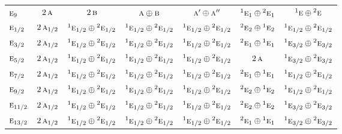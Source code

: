 \documentclass[10pt,a4paper]{article}
\numberwithin{equation}{section}
\newcommand{\irr}[1]{\text{\normalfont\scshape #1}}
\newcommand{\conjpair}[1]{{}^{#1}}
\begin{document}
{\begin{longtable}{@{}lcccccc@{}}
$\irr{e}_{9}$ & $2\,\irr{a}$ & $2\,\irr{b}$ & $\irr{a}\oplus \irr{b}$ & $\irr{a}'\oplus \irr{a}''$ & $\conjpair{1}\irr{e}_{1}\oplus \conjpair{2}\irr{e}_{1}$ & $\conjpair{1}\irr{e}\oplus \conjpair{2}\irr{e}$\\
$\irr{e}_{1/2}$ & $2\,\irr{a}_{1/2}$ & $\conjpair{1}\irr{e}_{1/2}\oplus \conjpair{2}\irr{e}_{1/2}$ & $\conjpair{1}\irr{e}_{1/2}\oplus \conjpair{2}\irr{e}_{1/2}$ & $\conjpair{1}\irr{e}_{1/2}\oplus \conjpair{2}\irr{e}_{1/2}$ & $\conjpair{2}\irr{e}_{2}\oplus \conjpair{1}\irr{e}_{2}$ & $\conjpair{1}\irr{e}_{1/2}\oplus \conjpair{2}\irr{e}_{1/2}$\\
$\irr{e}_{3/2}$ & $2\,\irr{a}_{1/2}$ & $\conjpair{1}\irr{e}_{1/2}\oplus \conjpair{2}\irr{e}_{1/2}$ & $\conjpair{1}\irr{e}_{1/2}\oplus \conjpair{2}\irr{e}_{1/2}$ & $\conjpair{1}\irr{e}_{1/2}\oplus \conjpair{2}\irr{e}_{1/2}$ & $\conjpair{2}\irr{e}_{1}\oplus \conjpair{1}\irr{e}_{1}$ & $\conjpair{1}\irr{e}_{3/2}\oplus \conjpair{2}\irr{e}_{3/2}$\\
$\irr{e}_{5/2}$ & $2\,\irr{a}_{1/2}$ & $\conjpair{1}\irr{e}_{1/2}\oplus \conjpair{2}\irr{e}_{1/2}$ & $\conjpair{1}\irr{e}_{1/2}\oplus \conjpair{2}\irr{e}_{1/2}$ & $\conjpair{1}\irr{e}_{1/2}\oplus \conjpair{2}\irr{e}_{1/2}$ & $2\,\irr{a}$ & $\conjpair{1}\irr{e}_{3/2}\oplus \conjpair{2}\irr{e}_{3/2}$\\
$\irr{e}_{7/2}$ & $2\,\irr{a}_{1/2}$ & $\conjpair{1}\irr{e}_{1/2}\oplus \conjpair{2}\irr{e}_{1/2}$ & $\conjpair{1}\irr{e}_{1/2}\oplus \conjpair{2}\irr{e}_{1/2}$ & $\conjpair{1}\irr{e}_{1/2}\oplus \conjpair{2}\irr{e}_{1/2}$ & $\conjpair{2}\irr{e}_{1}\oplus \conjpair{1}\irr{e}_{1}$ & $\conjpair{1}\irr{e}_{1/2}\oplus \conjpair{2}\irr{e}_{1/2}$\\
$\irr{e}_{9/2}$ & $2\,\irr{a}_{1/2}$ & $\conjpair{1}\irr{e}_{1/2}\oplus \conjpair{2}\irr{e}_{1/2}$ & $\conjpair{1}\irr{e}_{1/2}\oplus \conjpair{2}\irr{e}_{1/2}$ & $\conjpair{1}\irr{e}_{1/2}\oplus \conjpair{2}\irr{e}_{1/2}$ & $\conjpair{2}\irr{e}_{2}\oplus \conjpair{1}\irr{e}_{2}$ & $\conjpair{1}\irr{e}_{1/2}\oplus \conjpair{2}\irr{e}_{1/2}$\\
$\irr{e}_{11/2}$ & $2\,\irr{a}_{1/2}$ & $\conjpair{1}\irr{e}_{1/2}\oplus \conjpair{2}\irr{e}_{1/2}$ & $\conjpair{1}\irr{e}_{1/2}\oplus \conjpair{2}\irr{e}_{1/2}$ & $\conjpair{1}\irr{e}_{1/2}\oplus \conjpair{2}\irr{e}_{1/2}$ & $\conjpair{2}\irr{e}_{2}\oplus \conjpair{1}\irr{e}_{2}$ & $\conjpair{1}\irr{e}_{3/2}\oplus \conjpair{2}\irr{e}_{3/2}$\\
$\irr{e}_{13/2}$ & $2\,\irr{a}_{1/2}$ & $\conjpair{1}\irr{e}_{1/2}\oplus \conjpair{2}\irr{e}_{1/2}$ & $\conjpair{1}\irr{e}_{1/2}\oplus \conjpair{2}\irr{e}_{1/2}$ & $\conjpair{1}\irr{e}_{1/2}\oplus \conjpair{2}\irr{e}_{1/2}$ & $\conjpair{2}\irr{e}_{1}\oplus \conjpair{1}\irr{e}_{1}$ & $\conjpair{1}\irr{e}_{3/2}\oplus \conjpair{2}\irr{e}_{3/2}$\\

\end{longtable}}
\end{document}
